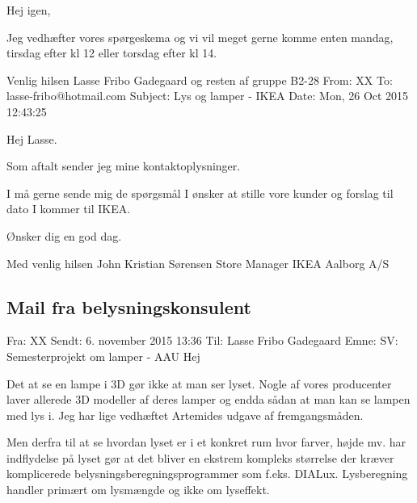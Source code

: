 Hej igen,\newline

Jeg vedhæfter vores spørgeskema og vi vil meget gerne komme enten mandag, tirsdag efter kl 12 eller torsdag efter kl 14. \newline

Venlig hilsen\newline
Lasse Fribo Gadegaard og resten af gruppe B2-28
\noindent\makebox[\linewidth]{\rule{\paperwidth}{0.4pt}}
From: XX\newline
To: lasse-fribo@hotmail.com\newline
Subject: Lys og lamper - IKEA\newline
Date: Mon, 26 Oct 2015 12:43:25\newline

Hej Lasse.\newline

Som aftalt sender jeg mine kontaktoplysninger.\newline

I må gerne sende mig de spørgsmål I ønsker at stille vore kunder og forslag til dato I kommer til IKEA.\newline

Ønsker dig en god dag.\newline

Med venlig hilsen\newline
John Kristian Sørensen\newline
Store Manager\newline
IKEA Aalborg A/S\newline

\subsection{Mail fra belysningskonsulent}
\label{sec:mailbelysning}
Fra: XX \newline
Sendt: 6. november 2015 13:36 \newline
Til: Lasse Fribo Gadegaard\newline
Emne: SV: Semesterprojekt om lamper - AAU\newline
Hej
 
Det at se en lampe i 3D gør ikke at man ser lyset. Nogle af vores producenter laver allerede 3D modeller af deres lamper og endda sådan at man kan se lampen med lys i. Jeg har lige vedhæftet Artemides udgave af fremgangsmåden.

Men derfra til at se hvordan lyset er i et konkret rum hvor farver, højde mv. har indflydelse på lyset gør at det bliver en ekstrem kompleks størrelse der kræver komplicerede belysningsberegningsprogrammer som f.eks. DIALux. Lysberegning handler primært om lysmængde og ikke om lyseffekt.

